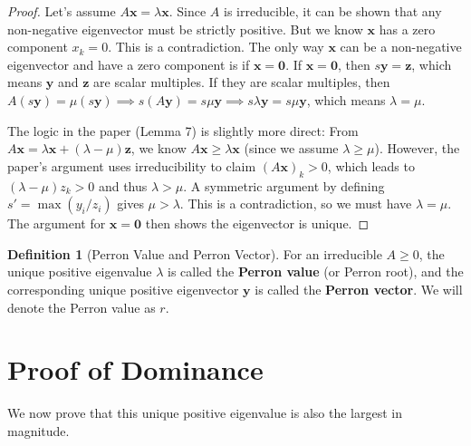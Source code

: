 \documentclass[12pt,a4paper]{report}
\theoremstyle{plain}
\theoremstyle{definition}
\newtheorem{definition}[theorem]{Definition}
\theoremstyle{remark}
\begin{document}
\begin{proof}
Let's assume $A\bm{x} = \lambda \bm{x}$. Since $A$ is irreducible, it can be shown that any non-negative eigenvector must be strictly positive. But we know $\bm{x}$ has a zero component $x_k=0$. This is a contradiction. The only way $\bm{x}$ can be a non-negative eigenvector and have a zero component is if $\bm{x} = \bm{0}$.
If $\bm{x} = \bm{0}$, then $s\bm{y} = \bm{z}$, which means $\bm{y}$ and $\bm{z}$ are scalar multiples.
If they are scalar multiples, then $A(s\bm{y}) = \mu(s\bm{y}) \implies s(A\bm{y}) = s\mu\bm{y} \implies s\lambda\bm{y} = s\mu\bm{y}$, which means $\lambda = \mu$.

The logic in the paper (Lemma 7) is slightly more direct:
From $A\bm{x} = \lambda \bm{x} + (\lambda - \mu)\bm{z}$, we know $A\bm{x} \ge \lambda \bm{x}$ (since we assume $\lambda \ge \mu$).
However, the paper's argument uses irreducibility to claim $(A\bm{x})_k > 0$, which leads to $(\lambda - \mu)z_k > 0$ and thus $\lambda > \mu$.
A symmetric argument by defining $s' = \max(y_i/z_i)$ gives $\mu > \lambda$. This is a contradiction, so we must have $\lambda = \mu$.
The argument for $\bm{x}=\bm{0}$ then shows the eigenvector is unique.
\end{proof}

\begin{definition}[Perron Value and Perron Vector]
For an irreducible $A \ge 0$, the unique positive eigenvalue $\lambda$ is called the \textbf{Perron value} (or Perron root), and the corresponding unique positive eigenvector $\bm{y}$ is called the \textbf{Perron vector}. We will denote the Perron value as $r$.
\end{definition}

\section{Proof of Dominance}
We now prove that this unique positive eigenvalue is also the largest in magnitude.
\end{document}
